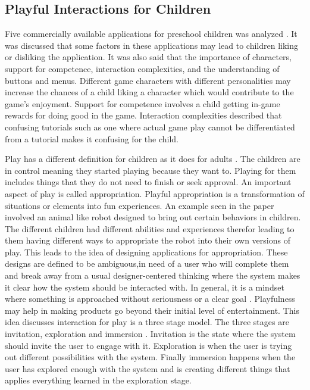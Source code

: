 \subsection{Playful Interactions for Children}
Five commercially available applications for preschool children was analyzed \cite{gray2018designing}. It was discussed that some factors in these applications may lead to children liking or disliking the application. It was also said that the importance of characters, support for competence, interaction complexities, and the understanding of buttons and menus. Different game characters with different personalities may increase the chances of a child liking a character which would contribute to the game's enjoyment. Support for competence involves a child getting in-game rewards for doing good in the game. Interaction complexities described that confusing tutorials such as one where actual game play cannot be differentiated from a tutorial makes it confusing for the child.

Play has a different definition for children as it does for adults \cite{scheepmaker2018things}. The children are in control meaning they started playing because they want to. Playing for them includes things that they do not need to finish or seek approval. An important aspect of play is called appropriation. Playful appropriation is a transformation of situations or elements into fun experiences. An example seen in the paper involved an animal like robot designed to bring out certain behaviors in children. The different children had different abilities and experiences therefor leading to them having different ways to appropriate the robot into their own versions of play. This leads to the idea of designing applications for appropriation. These designs are defined to be ambiguous,in need of a user who will complete them and break away from a usual designer-centered thinking where the system makes it clear how the system should be interacted with. 
In general, it is a mindset where something is approached without seriousness or a clear goal \cite{li2018understanding}. Playfulness may help in making products go beyond their initial level of entertainment. This idea discusses interaction for play is a three stage model. The three stages are invitation, exploration and immersion \cite{crowell2018role}. Invitation is the state where the system should invite the user to engage with it. Exploration is when the user is trying out different possibilities with the system. Finally immersion happens when the user has explored enough with the system and is creating different things that applies everything learned in the exploration stage.

